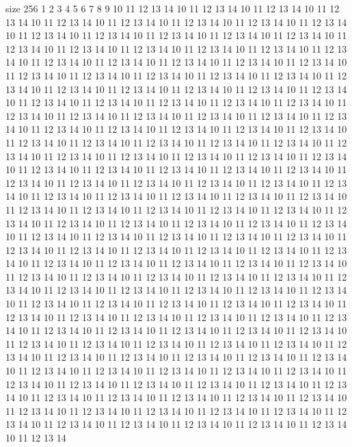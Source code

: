 size 256
1 2 3 4 5 6 7 8 9
10 11 12 13 14
10 11 12 13 14
10 11 12 13 14
10 11 12 13 14
10 11 12 13 14
10 11 12 13 14
10 11 12 13 14
10 11 12 13 14
10 11 12 13 14
10 11 12 13 14
10 11 12 13 14
10 11 12 13 14
10 11 12 13 14
10 11 12 13 14
10 11 12 13 14
10 11 12 13 14
10 11 12 13 14
10 11 12 13 14
10 11 12 13 14
10 11 12 13 14
10 11 12 13 14
10 11 12 13 14
10 11 12 13 14
10 11 12 13 14
10 11 12 13 14
10 11 12 13 14
10 11 12 13 14
10 11 12 13 14
10 11 12 13 14
10 11 12 13 14
10 11 12 13 14
10 11 12 13 14
10 11 12 13 14
10 11 12 13 14
10 11 12 13 14
10 11 12 13 14
10 11 12 13 14
10 11 12 13 14
10 11 12 13 14
10 11 12 13 14
10 11 12 13 14
10 11 12 13 14
10 11 12 13 14
10 11 12 13 14
10 11 12 13 14
10 11 12 13 14
10 11 12 13 14
10 11 12 13 14
10 11 12 13 14
10 11 12 13 14
10 11 12 13 14
10 11 12 13 14
10 11 12 13 14
10 11 12 13 14
10 11 12 13 14
10 11 12 13 14
10 11 12 13 14
10 11 12 13 14
10 11 12 13 14
10 11 12 13 14
10 11 12 13 14
10 11 12 13 14
10 11 12 13 14
10 11 12 13 14
10 11 12 13 14
10 11 12 13 14
10 11 12 13 14
10 11 12 13 14
10 11 12 13 14
10 11 12 13 14
10 11 12 13 14
10 11 12 13 14
10 11 12 13 14
10 11 12 13 14
10 11 12 13 14
10 11 12 13 14
10 11 12 13 14
10 11 12 13 14
10 11 12 13 14
10 11 12 13 14
10 11 12 13 14
10 11 12 13 14
10 11 12 13 14
10 11 12 13 14
10 11 12 13 14
10 11 12 13 14
10 11 12 13 14
10 11 12 13 14
10 11 12 13 14
10 11 12 13 14
10 11 12 13 14
10 11 12 13 14
10 11 12 13 14
10 11 12 13 14
10 11 12 13 14
10 11 12 13 14
10 11 12 13 14
10 11 12 13 14
10 11 12 13 14
10 11 12 13 14
10 11 12 13 14
10 11 12 13 14
10 11 12 13 14
10 11 12 13 14
10 11 12 13 14
10 11 12 13 14
10 11 12 13 14
10 11 12 13 14
10 11 12 13 14
10 11 12 13 14
10 11 12 13 14
10 11 12 13 14
10 11 12 13 14
10 11 12 13 14
10 11 12 13 14
10 11 12 13 14
10 11 12 13 14
10 11 12 13 14
10 11 12 13 14
10 11 12 13 14
10 11 12 13 14
10 11 12 13 14
10 11 12 13 14
10 11 12 13 14
10 11 12 13 14
10 11 12 13 14
10 11 12 13 14
10 11 12 13 14
10 11 12 13 14
10 11 12 13 14
10 11 12 13 14
10 11 12 13 14
10 11 12 13 14
10 11 12 13 14
10 11 12 13 14
10 11 12 13 14
10 11 12 13 14
10 11 12 13 14
10 11 12 13 14
10 11 12 13 14
10 11 12 13 14
10 11 12 13 14
10 11 12 13 14
10 11 12 13 14
10 11 12 13 14
10 11 12 13 14
10 11 12 13 14
10 11 12 13 14
10 11 12 13 14
10 11 12 13 14
10 11 12 13 14
10 11 12 13 14
10 11 12 13 14
10 11 12 13 14
10 11 12 13 14
10 11 12 13 14
10 11 12 13 14
10 11 12 13 14
10 11 12 13 14
10 11 12 13 14
10 11 12 13 14
10 11 12 13 14
10 11 12 13 14
10 11 12 13 14
10 11 12 13 14
10 11 12 13 14
10 11 12 13 14
10 11 12 13 14
10 11 12 13 14
10 11 12 13 14
10 11 12 13 14
10 11 12 13 14
